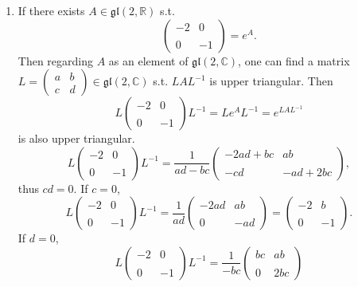 \begin{enumerate}
Connectedness is necessary: Consider $G=\mathbb{Z}, H=\mathbb{R}$, 
$\varphi\colon \mathbb{Z} \rightarrow \mathbb{R}, x \mapsto x^{2}$.
\item If there exists $A \in \mathfrak{gl}(2, \mathbb{R})$ s.t.
\[\begin{pmatrix}-2 & 0 \\ \\ 0 & -1\end{pmatrix}=e^{A}.\]
Then regarding $A$ as an element of $\mathfrak{gl}(2, \mathbb{C})$, 
one can find a matrix $L=\begin{pmatrix}a & b \\ c & d\end{pmatrix} \in \mathfrak{gl}(2, \mathbb{C})$ 
s.t. $LAL^{-1}$ is upper triangular. Then
\[L\begin{pmatrix}-2 & 0 \\ \\ 0 & -1\end{pmatrix} L^{-1}=Le^{A}L^{-1}=e^{LAL^{-1}}\]
is also upper triangular.
\[L\begin{pmatrix}-2 & 0 \\ \\ 0 & -1\end{pmatrix} L^{-1}
=\frac{1}{ad-bc}\begin{pmatrix}-2ad+bc & ab \\ \\ -cd & -ad+2bc\end{pmatrix},\]
thus $cd=0$. If $c=0$,
\[L\begin{pmatrix}-2 & 0 \\ \\ 0 & -1\end{pmatrix} L^{-1}
=\frac{1}{ad}\begin{pmatrix}-2 ad & ab \\ \\ 0 & -ad\end{pmatrix}
=\begin{pmatrix}-2 & b \\ \\ 0 & -1\end{pmatrix}.\]
If $d=0$,
\[L\begin{pmatrix}-2 & 0 \\ \\ 0 & -1\end{pmatrix} L^{-1}
=\frac{1}{-bc}\begin{pmatrix}bc & ab \\ \\ 0 & 2bc\end{pmatrix}
\]
\end{enumerate}
